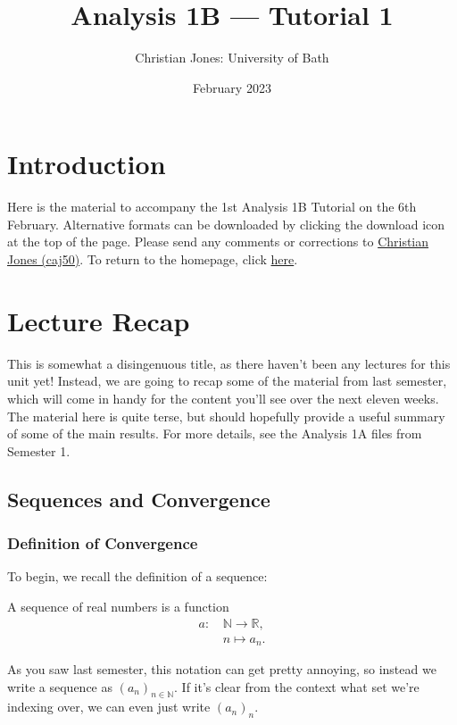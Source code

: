 \documentclass[
  17pt,
  a4paper]{extarticle}
\title{Analysis 1B --- Tutorial 1}
\author{Christian Jones: University of Bath}
\date{February 2023}
\theoremstyle{plain}
\theoremstyle{definition}
\theoremstyle{plain}
\theoremstyle{plain}
\theoremstyle{plain}
\theoremstyle{plain}
\theoremstyle{definition}
\theoremstyle{definition}
\theoremstyle{remark}
\theoremstyle{remark}
\let\BeginKnitrBlock\begin \let\EndKnitrBlock\end
\renewcommand{\;}{\,}
\begin{document}
\maketitle

{
\setcounter{tocdepth}{2}
\tableofcontents
}
\newpage
{}

\hypertarget{introduction}{%
\section*{Introduction}\label{introduction}}

Here is the material to accompany the 1st Analysis 1B Tutorial on the 6th February. Alternative formats can be downloaded by clicking the download icon at the top of the page. Please send any comments or corrections to \href{mailto:caj50@bath.ac.uk}{Christian Jones (caj50)}. To return to the homepage, click \href{http://caj50.github.io/tutoring.html}{here}.

\hypertarget{lecture-recap}{%
\section{Lecture Recap}\label{lecture-recap}}

This is somewhat a disingenuous title, as there haven't been any lectures for this unit yet! Instead, we are going to recap some of the material from last semester, which will come in handy for the content you'll see over the next eleven weeks. The material here is quite terse, but should hopefully provide a useful summary of some of the main results. For more details, see the Analysis 1A files from Semester 1.

\hypertarget{sequences-and-convergence}{%
\subsection{Sequences and Convergence}\label{sequences-and-convergence}}

\hypertarget{definition-of-convergence}{%
\subsubsection{Definition of Convergence}\label{definition-of-convergence}}

To begin, we recall the definition of a sequence:
\BeginKnitrBlock{definition}[Sequence]
{\label{def:def1} }A sequence of real numbers is a function
\begin{align*}
    a:\; &\mathbb{N} \longrightarrow \mathbb{R},\\
    &n \longmapsto a_n.
\end{align*}
\EndKnitrBlock{definition}
As you saw last semester, this notation can get pretty annoying, so instead we write a sequence as \((a_n)_{n\in\mathbb{N}}\). If it's clear from the context what set we're indexing over, we can even just write \((a_n)_n\).
\end{document}
